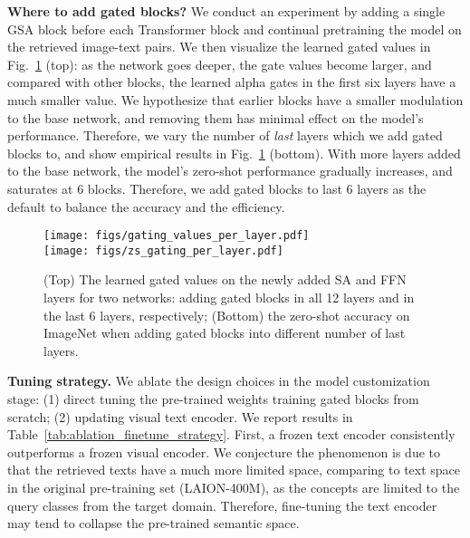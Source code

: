 \documentclass[10pt,twocolumn,letterpaper]{article}
\renewcommand{\paragraph}[1]{\vspace{1.25mm}\noindent\textbf{#1}}
\begin{document}
\paragraph{Where to add gated blocks?}  We conduct an experiment by adding a single GSA block before each Transformer block and continual pretraining the model on the retrieved image-text pairs.  We then visualize the learned gated values in Fig.~\ref{fig:gated_blocks} (top): as the network goes deeper, the gate values become larger, and compared with other blocks, the learned alpha gates in the first six layers have a much smaller value.  We hypothesize that earlier blocks have a smaller modulation to the base network, and removing them has minimal effect on the model's performance. Therefore, we vary the number of \emph{last} layers which we add gated blocks to, and show empirical results in Fig.~\ref{fig:gated_blocks} (bottom).  With more layers added to the base network, the model's zero-shot performance gradually increases, and saturates at 6 blocks.
Therefore, we add gated blocks to last 6 layers as the default to balance the accuracy and the efficiency.

\begin{figure}[t]
	\centering
	\texttt{[image: figs/gating\_values\_per\_layer.pdf]}\\
	\vspace{-3mm}
	\texttt{[image: figs/zs\_gating\_per\_layer.pdf]}
\vspace{-3mm}
    \caption{(Top) The learned gated values on the newly added SA and FFN layers for two networks: adding gated blocks in all 12 layers and in the last 6 layers, respectively; (Bottom) the zero-shot accuracy on ImageNet when adding gated blocks into different number of last layers.}
    \label{fig:gated_blocks}\vspace{-3mm}
\end{figure}



\paragraph{Tuning strategy.}  We ablate the design choices in the model customization stage: (1) direct tuning the pre-trained weights \vs training gated blocks from scratch; (2) updating visual \vs text encoder.  We report results in  Table~\ref{tab:ablation_finetune_strategy}.
First, a frozen text encoder consistently outperforms a frozen visual encoder. We conjecture the phenomenon is due to that the retrieved texts have a much more limited space, comparing to text space in the original pre-training set (\eg LAION-400M), as the concepts are limited to the query classes from the target domain. 
Therefore, fine-tuning the text encoder may tend to collapse the pre-trained semantic space.
\end{document}
